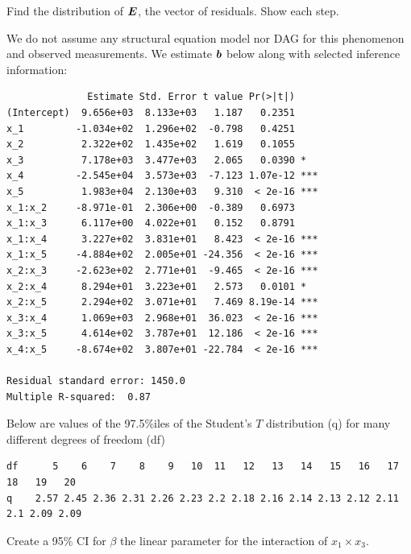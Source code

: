 \documentclass[12pt]{article}
\begin{document}
\begin{enumerate}[(a)]
 Find the distribution of $\boldsymbol{E}$, the vector of residuals. Show each step.


We do not assume any structural equation model nor DAG for this phenomenon and observed measurements. We estimate $\boldsymbol{b}$ below along with selected inference information:

\begin{Verbatim}
              Estimate Std. Error t value Pr(>|t|)    
(Intercept)  9.656e+03  8.133e+03   1.187   0.2351    
x_1         -1.034e+02  1.296e+02  -0.798   0.4251    
x_2          2.322e+02  1.435e+02   1.619   0.1055    
x_3          7.178e+03  3.477e+03   2.065   0.0390 *  
x_4         -2.545e+04  3.573e+03  -7.123 1.07e-12 ***
x_5          1.983e+04  2.130e+03   9.310  < 2e-16 ***
x_1:x_2     -8.971e-01  2.306e+00  -0.389   0.6973    
x_1:x_3      6.117e+00  4.022e+01   0.152   0.8791    
x_1:x_4      3.227e+02  3.831e+01   8.423  < 2e-16 ***
x_1:x_5     -4.884e+02  2.005e+01 -24.356  < 2e-16 ***
x_2:x_3     -2.623e+02  2.771e+01  -9.465  < 2e-16 ***
x_2:x_4      8.294e+01  3.223e+01   2.573   0.0101 *  
x_2:x_5      2.294e+02  3.071e+01   7.469 8.19e-14 ***
x_3:x_4      1.069e+03  2.968e+01  36.023  < 2e-16 ***
x_3:x_5      4.614e+02  3.787e+01  12.186  < 2e-16 ***
x_4:x_5     -8.674e+02  3.807e+01 -22.784  < 2e-16 ***

Residual standard error: 1450.0
Multiple R-squared:  0.87
\end{Verbatim}
\pagebreak

Below are values of the 97.5\%iles of the Student's $T$ distribution (q) for many different degrees of freedom (df)

\begin{Verbatim}[fontsize=\footnotesize]
df      5    6    7    8    9   10  11   12   13   14   15   16   17  18   19   20
q    2.57 2.45 2.36 2.31 2.26 2.23 2.2 2.18 2.16 2.14 2.13 2.12 2.11 2.1 2.09 2.09
\end{Verbatim}

 Create a 95\% CI for $\beta$  the linear parameter for the interaction of $x_1 \times x_3$. 


\end{enumerate}
\end{document}
